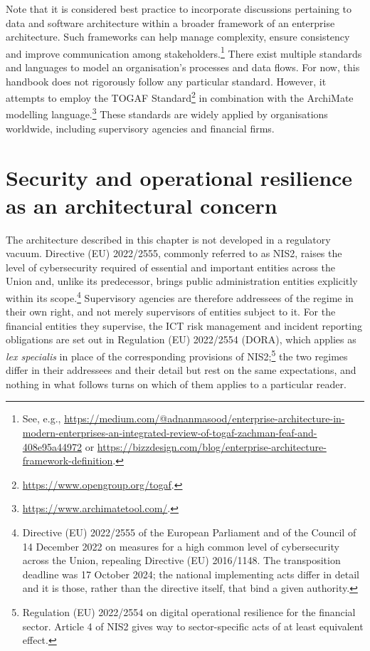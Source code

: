 \documentclass[a4paper, 11pt]{report}
\begin{document}
Note that it is considered best practice to incorporate discussions pertaining to data and software architecture within a broader framework of an enterprise architecture. Such frameworks can help manage complexity, ensure consistency and improve communication among stakeholders.\footnote{See, e.g., \url{https://medium.com/@adnanmasood/enterprise-architecture-in-modern-enterprises-an-integrated-review-of-togaf-zachman-feaf-and-408e95a44972} or \url{https://bizzdesign.com/blog/enterprise-architecture-framework-definition}.} There exist multiple standards and languages to model an organisation's processes and data flows. For now, this handbook does not rigorously follow any particular standard. However, it attempts to employ the TOGAF Standard\footnote{\url{https://www.opengroup.org/togaf}.} in combination with the ArchiMate modelling language.\footnote{\url{https://www.archimatetool.com/}.} These standards are widely applied by organisations worldwide, including supervisory agencies and financial firms.



\section{Security and operational resilience as an architectural concern\label{sec:intro-nis2}}

The architecture described in this chapter is not developed in a regulatory vacuum. Directive (EU) 2022/2555, commonly referred to as NIS2, raises the level of cybersecurity required of essential and important entities across the Union and, unlike its predecessor, brings public administration entities explicitly within its scope.\footnote{Directive (EU) 2022/2555 of the European Parliament and of the Council of 14 December 2022 on measures for a high common level of cybersecurity across the Union, repealing Directive (EU) 2016/1148. The transposition deadline was 17 October 2024; the national implementing acts differ in detail and it is those, rather than the directive itself, that bind a given authority.} Supervisory agencies are therefore addressees of the regime in their own right, and not merely supervisors of entities subject to it. For the financial entities they supervise, the ICT risk management and incident reporting obligations are set out in Regulation (EU) 2022/2554 (DORA), which applies as \emph{lex specialis} in place of the corresponding provisions of NIS2;\footnote{Regulation (EU) 2022/2554 on digital operational resilience for the financial sector. Article 4 of NIS2 gives way to sector-specific acts of at least equivalent effect.} the two regimes differ in their addressees and their detail but rest on the same expectations, and nothing in what follows turns on which of them applies to a particular reader.
\end{document}
